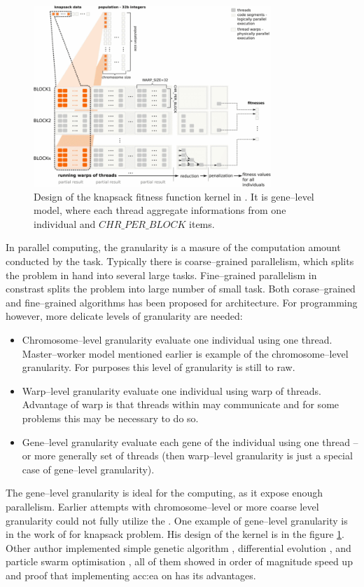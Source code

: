 \begin{figure}[hb!]
    \centering
    \includegraphics[width=0.8\textwidth]{img/KnapsackKernelDesign.png}
    \caption[Knapsack problem CUDA evaluation kernel]{Design of the knapsack fitness function kernel in \citet{GpuIsland}. It is gene--level model, where each thread aggregate informations from one individual and $CHR\_PER\_BLOCK$ items.}
    \label{fig:knapsackkernel}
\end{figure}

In parallel computing, the granularity is a masure of the computation amount conducted by the task. Typically there is coarse--grained parallelism, which splits the problem in hand into several large tasks. Fine--grained parallelism in constrast splits the problem into large number of small task. Both corase--grained and fine--grained algorithms has been proposed for \cpu architecture. For \gpu programming however, more delicate levels of granularity are needed:
\begin{itemize}
    \item Chromosome--level granularity evaluate one individual using one thread. Master--worker model mentioned earlier is example of the chromosome--level granularity. For \cuda purposes this level of granularity is still to raw.
    \item Warp--level granularity evaluate one individual using warp of threads. Advantage of warp is that threads within may communicate and for some problems this may be necessary to do so.
    \item Gene--level granularity evaluate each gene of the individual using one thread -- or more generally set of threads (then warp--level granularity is just a special case of gene--level granularity).     
\end{itemize}
The gene--level granularity is ideal for the \gpu computing, as it expose enough parallelism. Earlier attempts with chromosome--level or more coarse level granularity could not fully utilize the \gpuns. One example of gene--level granularity is in the work of \citet*{GpuIsland} for knapsack problem. His design of the \cuda kernel is in the figure \ref{fig:knapsackkernel}. Other author implemented simple genetic algorithm \citep{SimpleGACUDA}, differential evolution \citep{veronese2010differential}, and particle swarm optimisation \citep{PSOCUDA}, all of them showed in order of magnitude speed up and proof that implementing \acrlong{acc:ea} on \gpu has its advantages.
